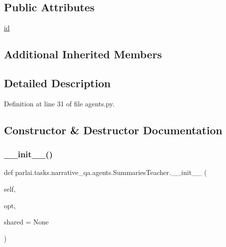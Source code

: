 \subsection*{Public Attributes}
\begin{DoxyCompactItemize}
\item 
\hyperlink{classparlai_1_1tasks_1_1narrative__qa_1_1agents_1_1SummariesTeacher_a00d240ba5d5d8c7ba0257dbbbc2ba58c}{id}
\end{DoxyCompactItemize}
\subsection*{Additional Inherited Members}


\subsection{Detailed Description}


Definition at line 31 of file agents.\+py.



\subsection{Constructor \& Destructor Documentation}
\mbox{\label{classparlai_1_1tasks_1_1narrative__qa_1_1agents_1_1SummariesTeacher_a833c2c54f6084e88dbe0a16151fc4a46}} 
\subsubsection{\texorpdfstring{\+\_\+\+\_\+init\+\_\+\+\_\+()}{\_\_init\_\_()}}
{\footnotesize\ttfamily def parlai.\+tasks.\+narrative\+\_\+qa.\+agents.\+Summaries\+Teacher.\+\_\+\+\_\+init\+\_\+\+\_\+ (\begin{DoxyParamCaption}\item[{}]{self,  }\item[{}]{opt,  }\item[{}]{shared = {\ttfamily None} }\end{DoxyParamCaption})}



